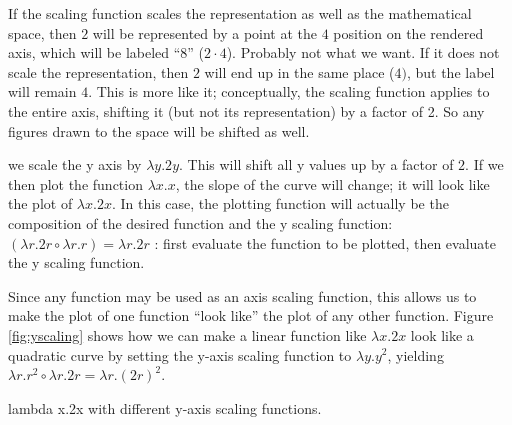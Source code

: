 \documentclass[reqno,12pt]{tufte-handout}
\numberwithin{equation}{subsection}
\numberwithin{equation}{subsection}
\begin{document}
  If the scaling function scales the representation as well as the
  mathematical space, then \(2\) will be represented by a point at the \(4\)
  position on the rendered axis, which will be labeled ``8'' (\(2\cdot
  4\)).  Probably not what we want.  If it does not scale the
  representation, then \(2\) will end up in the same place (\(4)\), but
  the label will remain \(4\).  This is more like it; conceptually, the
  scaling function applies to the entire axis, shifting it (but not its
  representation) by a factor of 2.  So any figures drawn to the space
  will be shifted as well.

   we scale the y axis by \(\lambda y.2y\).
  This will shift all y values up by a factor of \(2\).  If we then plot
  the function \(\lambda x.x\), the slope of the curve will change; it
  will look like the plot of \(\lambda x.2x\).  In this case, the
  plotting function will actually be the composition of the desired
  function and the y scaling function: \((\lambda r.2r\circ\lambda r.r)
  = \lambda r.2r\)%
  : first evaluate the function to be plotted, then
  evaluate the y scaling function.

  Since any function may be used as an axis scaling function, this
  allows us to make the plot of one function ``look like'' the plot of
  any other function.  Figure \ref{fig:yscaling} shows how we can make a
  linear function like \(\lambda x.2x\) look like a quadratic curve by setting the y-axis
  scaling function to \(\lambda y.y^2\), yielding \(\lambda
  r.r^2\circ\lambda r.2r = \lambda r.(2r)^2\).

  \begin{marginfigure}[12pt]%
    \hspace{8pt}
    \vspace{12pt}
    \caption{lambda x.2x with different y-axis scaling functions.}
    \label{fig:yscaling}
  \end{marginfigure}%
\end{document}
